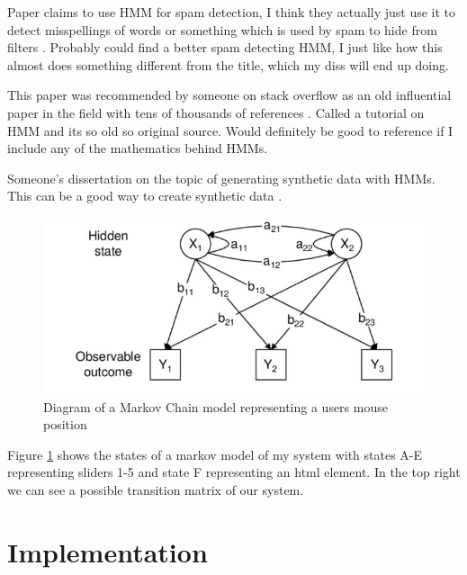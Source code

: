 \documentclass{article}
\begin{document}
Paper claims to use HMM for spam detection, I think they actually just use it to detect misspellings of words or something which is used by spam to hide from filters \cite{gordillo2007hmm}.
Probably could find a better spam detecting HMM, I just like how this almost does something different from the title, which my diss will end up doing.

This paper was recommended by someone on stack overflow as an old influential paper in the field with tens of thousands of references \cite{rabiner1989tutorial}.
Called a tutorial on HMM and its so old so original source. 
Would definitely be good to reference if I include any of the mathematics behind HMMs. 

Someone's dissertation on the topic of generating synthetic data with HMMs.
This can be a good way to create synthetic data \cite{ferrando2018generating}.


\begin{figure}[ht]
    \centering
    \includegraphics[scale=1.5]{Images/HMM-Paper-Diagram.png}
    \caption{Diagram of a Markov Chain model representing a users mouse position}
    \label{fig:Markov}
\end{figure}

Figure \ref{fig:Markov} shows the states of a markov model of my system with states A-E representing sliders 1-5 and state F representing an html element.
In the top right we can see a possible transition matrix of our system.

\section{Implementation}
\end{document}
